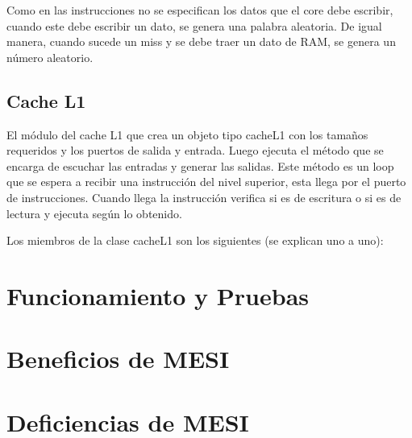 \documentclass {article}
\begin{document}
Como en las instrucciones no se especifican los datos que el core debe escribir, cuando este debe
escribir un dato, se genera una palabra aleatoria. De igual manera, cuando sucede un miss y se debe
traer un dato de RAM, se genera un número aleatorio.

\subsection{Cache L1}
El módulo del cache L1 que crea un objeto tipo cacheL1 con los tamaños requeridos y los puertos de
salida y entrada. Luego ejecuta el método que se encarga de escuchar las entradas y generar las
salidas. Este método es un loop que se espera a recibir una instrucción del nivel superior, esta
llega por el puerto de instrucciones. Cuando llega la instrucción verifica si es de escritura o si
es de lectura y ejecuta según lo obtenido.

Los miembros de la clase cacheL1 son los siguientes (se explican uno a uno):
\section{Funcionamiento y Pruebas}

\section{Beneficios de MESI}

\section{Deficiencias de MESI}
\end{document}
